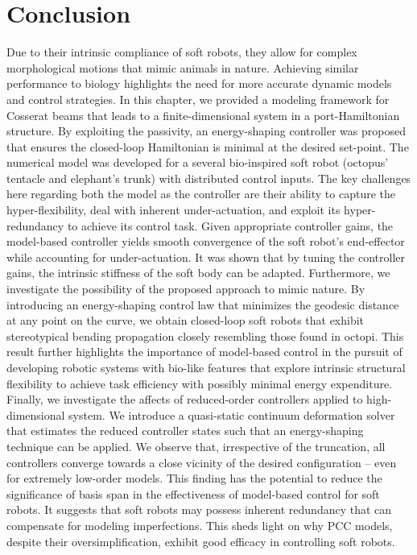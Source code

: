 \vspace{-5mm}
\section{Conclusion}
\label{sec:C3:conclusion}
Due to their intrinsic compliance of soft robots, they allow for complex morphological motions that mimic animals in nature. Achieving similar performance to biology highlights the need for more accurate dynamic models and control strategies. In this chapter, we provided a modeling framework for Cosserat beams that leads to a finite-dimensional system in a port-Hamiltonian structure. By exploiting the passivity, an energy-shaping controller was proposed that ensures the closed-loop Hamiltonian is minimal at the desired set-point. The numerical model was developed for a several bio-inspired soft robot (octopus' tentacle and elephant's trunk) with distributed control inputs. The key challenges here regarding both the model as the controller are their ability to capture the hyper-flexibility, deal with inherent under-actuation, and exploit its hyper-redundancy to achieve its control task. Given appropriate controller gains, the model-based controller yields smooth convergence of the soft robot's end-effector while accounting for under-actuation. It was shown that by tuning the controller gains, the intrinsic stiffness of the soft body can be adapted. Furthermore, we investigate the possibility of the proposed approach to mimic nature. By introducing an energy-shaping control law that minimizes the geodesic distance at any point on the curve, we obtain closed-loop soft robots that exhibit stereotypical bending propagation closely resembling those found in octopi. This result further highlights the importance of model-based control in the pursuit of developing robotic systems with bio-like features that explore intrinsic structural flexibility to achieve task efficiency with possibly minimal energy expenditure. Finally, we investigate the affects of reduced-order controllers applied to high-dimensional system. We introduce a quasi-static continuum deformation solver that estimates the reduced controller states such that an energy-shaping technique can be applied. We observe that, irrespective of the truncation, all controllers converge towards a close vicinity of the desired configuration -- even for extremely low-order models. This finding has the potential to reduce the significance of basis span in the effectiveness of model-based control for soft robots. It suggests that soft robots may possess inherent redundancy that can compensate for modeling imperfections. This sheds light on why PCC models, despite their oversimplification, exhibit good efficacy in controlling soft robots. 

